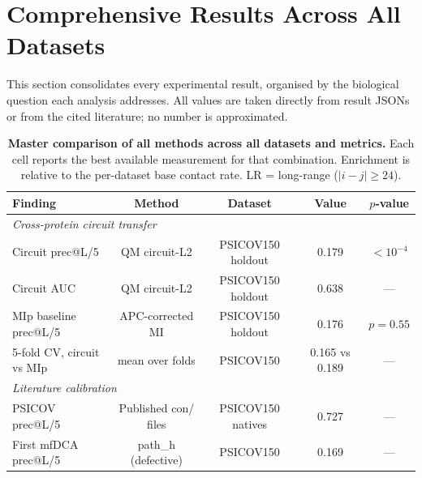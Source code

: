 \section{Comprehensive Results Across All Datasets}
\label{sec:all-results}

This section consolidates every experimental result, organised by the
biological question each analysis addresses.  All values are taken directly
from result JSONs or from the cited literature; no number is approximated.

\begin{table}[ht]
	\centering
	\caption{
		\textbf{Master comparison of all methods across all datasets and metrics.}
		Each cell reports the best available measurement for that combination.
		Enrichment is relative to the per-dataset base contact rate.
		LR = long-range ($|i-j| \geq 24$).
	}
	\label{tab:master-comparison}
	\small
	\begin{tabular}{p{2.8cm}cccc}
		\toprule
		\textbf{Finding}              & \textbf{Method}               & \textbf{Dataset}  & \textbf{Value}  & \textbf{$p$-value}    \\
		\midrule
		\multicolumn{5}{l}{\textit{Cross-protein circuit transfer}}                                                                 \\
		Circuit prec@L/5              & QM circuit-L2                 & PSICOV150 holdout & 0.179           & $<10^{-4}$            \\
		Circuit AUC                   & QM circuit-L2                 & PSICOV150 holdout & 0.638           & ---                   \\
		MIp baseline prec@L/5         & APC-corrected MI              & PSICOV150 holdout & 0.176           & $p=0.55$              \\
		5-fold CV, circuit vs MIp     & mean over folds               & PSICOV150         & 0.165 vs 0.189  & ---                   \\
		\midrule
		\multicolumn{5}{l}{\textit{Literature calibration}}                                                                         \\
		PSICOV prec@L/5               & Published con/ files          & PSICOV150 natives & 0.727           & ---                   \\
		First mfDCA prec@L/5          & path\_h (defective)            & PSICOV150         & 0.169           & ---                   \\

\end{tabular}
\end{table}
